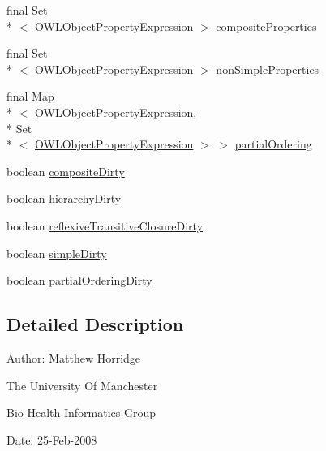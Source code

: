 \begin{DoxyCompactItemize}
\item 
final Set\\*
$<$ \hyperlink{interfaceorg_1_1semanticweb_1_1owlapi_1_1model_1_1_o_w_l_object_property_expression}{O\-W\-L\-Object\-Property\-Expression} $>$ \hyperlink{classorg_1_1semanticweb_1_1owlapi_1_1util_1_1_o_w_l_object_property_manager_a636c0401ac873b050bd27ed78a07be8c}{composite\-Properties}
\item 
final Set\\*
$<$ \hyperlink{interfaceorg_1_1semanticweb_1_1owlapi_1_1model_1_1_o_w_l_object_property_expression}{O\-W\-L\-Object\-Property\-Expression} $>$ \hyperlink{classorg_1_1semanticweb_1_1owlapi_1_1util_1_1_o_w_l_object_property_manager_a1fc51ae05c57dd67c1c33688d1da2af7}{non\-Simple\-Properties}
\item 
final Map\\*
$<$ \hyperlink{interfaceorg_1_1semanticweb_1_1owlapi_1_1model_1_1_o_w_l_object_property_expression}{O\-W\-L\-Object\-Property\-Expression}, \\*
Set\\*
$<$ \hyperlink{interfaceorg_1_1semanticweb_1_1owlapi_1_1model_1_1_o_w_l_object_property_expression}{O\-W\-L\-Object\-Property\-Expression} $>$ $>$ \hyperlink{classorg_1_1semanticweb_1_1owlapi_1_1util_1_1_o_w_l_object_property_manager_ac6a75c8cb886fdd27dacb94a8c33dd8a}{partial\-Ordering}
\item 
boolean \hyperlink{classorg_1_1semanticweb_1_1owlapi_1_1util_1_1_o_w_l_object_property_manager_a5b0e74d1d132eb8dcbe9c456912eb3cd}{composite\-Dirty}
\item 
boolean \hyperlink{classorg_1_1semanticweb_1_1owlapi_1_1util_1_1_o_w_l_object_property_manager_abccd1d8797c8f8219eaec0f30a5fc8e9}{hierarchy\-Dirty}
\item 
boolean \hyperlink{classorg_1_1semanticweb_1_1owlapi_1_1util_1_1_o_w_l_object_property_manager_aa7427af5c51f1a1fe723b5e21ba7ad51}{reflexive\-Transitive\-Closure\-Dirty}
\item 
boolean \hyperlink{classorg_1_1semanticweb_1_1owlapi_1_1util_1_1_o_w_l_object_property_manager_afdf81d56f9291810536ff30f897d1970}{simple\-Dirty}
\item 
boolean \hyperlink{classorg_1_1semanticweb_1_1owlapi_1_1util_1_1_o_w_l_object_property_manager_abe55d4f61e63af9e12b817b28b8175b7}{partial\-Ordering\-Dirty}
\end{DoxyCompactItemize}


\subsection{Detailed Description}
Author\-: Matthew Horridge\par
 The University Of Manchester\par
 Bio-\/\-Health Informatics Group\par
 Date\-: 25-\/\-Feb-\/2008\par
\par
 

